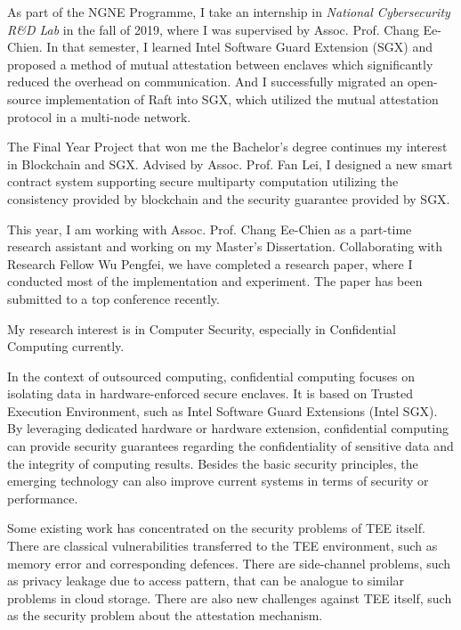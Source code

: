 \documentclass[11pt, a4paper]{awesome-cv}
\begin{document}
\begin{cvletter}
    As part of the NGNE Programme, I take an internship in \textit{National Cybersecurity R\&D Lab} in the fall of 2019, where I was supervised by Assoc. Prof. Chang Ee-Chien.
    In that semester, I learned Intel Software Guard Extension (SGX) and proposed a method of mutual attestation between enclaves which significantly reduced the overhead on communication.
    And I successfully migrated an open-source implementation of Raft into SGX, which utilized the mutual attestation protocol in a multi-node network.

    The Final Year Project that won me the Bachelor's degree continues my interest in Blockchain and SGX.
    Advised by Assoc. Prof. Fan Lei, I designed a new smart contract system supporting secure multiparty computation utilizing the consistency provided by blockchain and the security guarantee provided by SGX.

    This year, I am working with Assoc. Prof. Chang Ee-Chien as a part-time research assistant and working on my Master's Dissertation.
    Collaborating with Research Fellow Wu Pengfei, we have completed a research paper, where I conducted most of the implementation and experiment.
    The paper has been submitted to a top conference recently.


    My research interest is in Computer Security, especially in Confidential Computing currently.

    In the context of outsourced computing, confidential computing focuses on isolating data in hardware-enforced secure enclaves.
    It is based on Trusted Execution Environment, such as Intel Software Guard Extensions (Intel SGX).
    By leveraging dedicated hardware or hardware extension, confidential computing can provide security guarantees regarding the confidentiality of sensitive data and the integrity of computing results.
    Besides the basic security principles, the emerging technology can also improve current systems in terms of security or performance.

    Some existing work has concentrated on the security problems of TEE itself.
    There are classical vulnerabilities transferred to the TEE environment, such as memory error and corresponding defences.
    There are side-channel problems, such as privacy leakage due to access pattern, that can be analogue to similar problems in cloud storage.
    There are also new challenges against TEE itself, such as the security problem about the attestation mechanism.


\end{cvletter}
\end{document}
